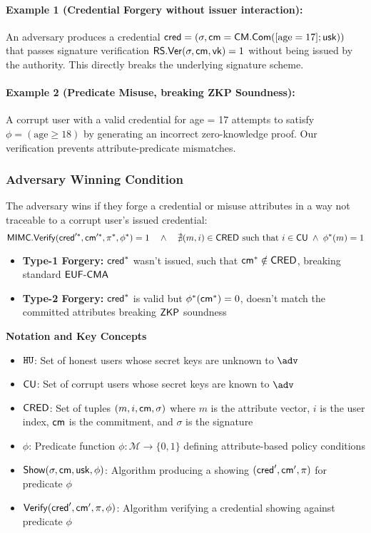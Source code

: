\paragraph{Example 1 (Credential Forgery without issuer interaction):} An adversary produces a credential $\mathsf{cred} = (\sigma, \mathsf{cm} = \mathsf{CM.Com}([\text{age}=17];\mathsf{usk}))$  that passes signature verification $\mathsf{RS.Ver}(\sigma,\mathsf{cm},\mathsf{vk})=1$ without being issued by the authority. This directly breaks the underlying signature scheme.

\paragraph{Example 2 (Predicate Misuse, breaking ZKP Soundness):} A corrupt user with a valid credential for age = 17
attempts to satisfy $\phi=(\text{age} \geq 18)$ by generating an incorrect zero-knowledge proof. Our verification prevents attribute-predicate mismatches.

\subsubsection{Adversary Winning Condition}
The adversary wins if they forge a credential or misuse attributes in a way not traceable to a corrupt user’s issued credential:
\[
\mathsf{MIMC.Verify}(\mathsf{cred}'^*, \mathsf{cm}'^*, \pi^*, \phi^*) = 1 \quad \wedge \quad \nexists (m, i) \in \mathsf{CRED} \text{ such that } i \in \mathsf{CU} \; \wedge \; \phi^*(m) = 1
\]

\begin{itemize}
    \item \textbf{Type-1 Forgery: } $\mathsf{cred}^*$ wasn't issued, such that $\mathsf{cm}^* \notin \mathsf{CRED}$, breaking standard $\mathsf{EUF\text{-}CMA}$
    \item \textbf{Type-2 Forgery: } $\mathsf{cred}^*$ is valid but $\phi^*(\mathsf{cm}^*) = 0$, doesn't match the committed attributes breaking $\mathsf{ZKP}$ soundness
\end{itemize}




\noindent\textbf{Notation and Key Concepts}
\begin{itemize}
    \item $\mathtt{HU}$: Set of honest users whose secret keys are unknown to $\adv$
    \item $\mathsf{CU}$: Set of corrupt users whose secret keys are known to $\adv$
    \item $\mathsf{CRED}$: Set of tuples $(m, i, \mathsf{cm}, \sigma)$ where $m$ is the attribute vector, $i$ is the user index, $\mathsf{cm}$ is the commitment, and $\sigma$ is the signature
    \item $\phi$: Predicate function $\phi: \mathcal{M} \rightarrow \{0,1\}$ defining attribute-based policy conditions
    \item $\mathsf{Show}(\sigma, \mathsf{cm}, \mathsf{usk}, \phi)$: Algorithm producing a showing $(\mathsf{cred}', \mathsf{cm}', \pi)$ for predicate $\phi$
    \item $\mathsf{Verify}(\mathsf{cred}', \mathsf{cm}', \pi, \phi)$: Algorithm verifying a credential showing against predicate $\phi$
\end{itemize} 

